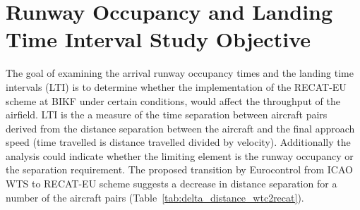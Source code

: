 \section{Runway Occupancy and Landing Time Interval Study Objective}
The goal of examining the arrival runway occupancy times and the landing time intervals (LTI) is to determine whether the implementation of the RECAT-EU scheme at BIKF under certain conditions, would affect the throughput of the airfield. 
LTI is the a measure of the time separation between aircraft pairs derived from the distance separation between the aircraft and the final approach speed (time travelled is distance travelled divided by velocity).
Additionally the analysis could indicate whether the limiting element is the runway occupancy or the separation requirement. The proposed transition by Eurocontrol from ICAO WTS to RECAT-EU scheme suggests a decrease in distance separation for a number of the aircraft pairs (Table~\ref{tab:delta_distance_wtc2recat}).

